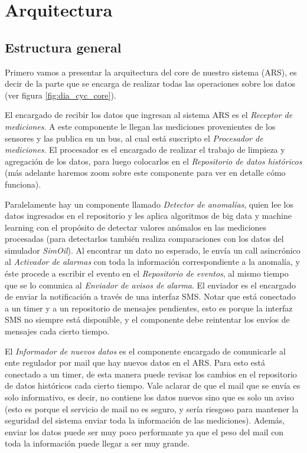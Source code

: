 \section{Arquitectura}

\subsection{Estructura general}

\par Primero vamos a presentar la arquitectura del core de nuestro sistema (ARS), es decir de la parte que se encarga de realizar todas las operaciones sobre los datos (ver figura \ref{fig:dia_cyc_core}).
\par El encargado de recibir los datos que ingresan al sistema ARS es el \textit{Receptor de mediciones}. A este componente le llegan las mediciones provenientes de los sensores y las publica en un bus, al cual está suscripto el \textit{Procesador de mediciones}. El procesador es el encargado de realizar el trabajo de limpieza y agregación de los datos, para luego colocarlos en el \textit{Repositorio de datos históricos} (más adelante haremos zoom sobre este componente para ver en detalle cómo funciona).
\par Paralelamente hay un componente llamado \textit{Detector de anomalías}, quien lee los datos ingresados en el repositorio y les aplica algoritmos de big data y machine learning con el propósito de detectar valores anómalos en las mediciones procesadas (para detectarlos también realiza comparaciones con los datos del simulador \textit{SimOil}). Al encontrar un dato no esperado, le envía un call asincrónico al \textit{Activador de alarmas} con toda la información correspondiente a la anomalía, y éste procede a escribir el evento en el \textit{Repositorio de eventos}, al mismo tiempo que se lo comunica al \textit{Enviador de avisos de alarma}. El enviador es el encargado de enviar la notificación a través de una interfaz SMS. Notar que está conectado a un timer y a un repositorio de mensajes pendientes, esto es porque la interfaz SMS no siempre está disponible, y el componente debe reintentar los envíos de mensajes cada cierto tiempo.
\par El \textit{Informador de nuevos datos} es el componente encargado de comunicarle al ente regulador por mail que hay nuevos datos en el ARS. Para esto está conectado a un timer, de esta manera puede revisar los cambios en el repositorio de datos históricos cada cierto tiempo. Vale aclarar de que el mail que se envía es solo informativo, es decir, no contiene los datos nuevos sino que es solo un aviso (esto es porque el servicio de mail no es seguro, y sería riesgoso para mantener la seguridad del sistema enviar toda la información de las mediciones). Además, enviar los datos puede ser muy poco performante ya que el peso del mail con toda la información puede llegar a ser muy grande.
